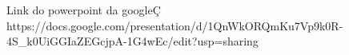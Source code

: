 Link do powerpoint da googleÇ
https://docs.google.com/presentation/d/1QnWkORQmKu7Vp9k0R-4S_k0UiGGIaZEGcjpA-1G4wEc/edit?usp=sharing
